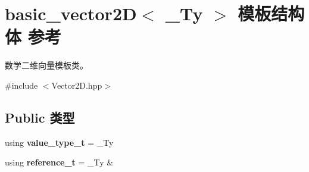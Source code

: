 \hypertarget{structbasic__vector2_d}{}\section{basic\+\_\+vector2D$<$ \+\_\+\+Ty $>$ 模板结构体 参考}
\label{structbasic__vector2_d}


数学二维向量模板类。  




{\ttfamily \#include $<$Vector2\+D.\+hpp$>$}

\subsection*{Public 类型}
\begin{DoxyCompactItemize}
\item 
\mbox{\label{structbasic__vector2_d_a3a8e15c6a773a34b04090604c981e63e}} 
using {\bfseries value\+\_\+type\+\_\+t} = \+\_\+\+Ty
\item 
\mbox{\label{structbasic__vector2_d_afa9c650d6178f708c88f7abab001c4a3}} 
using {\bfseries reference\+\_\+t} = \+\_\+\+Ty \&
\end{DoxyCompactItemize}
